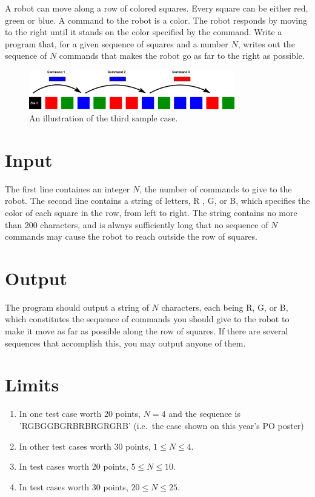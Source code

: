 
A robot can move along a row of colored squares. Every square can 
be either red, green or blue. A command to the robot is a color. The robot responds
by moving to the right until it stands on the color specified by the command. Write a program that,
for a given sequence of squares and a number $N$, writes out the sequence of $N$ commands that
makes the robot go as far to the right as possible.

\begin{figure}[ht!]
\centering
\includegraphics[width=0.8\textwidth]{fargrobot_eng.png}
\caption{An illustration of the third sample case.}
\label{overflow}
\end{figure}


\section*{Input}
The first line containes an integer $N$, the number of commands to give to the robot.
The second line contains a string of letters, R , G, or B, which specifies the color
of each square in the row, from left to right. The string contains no more than 
200 characters, and is always sufficiently long that no sequence of 
$N$ commands may cause the robot to reach outside the row of squares.

\section*{Output}

The program should output a string of $N$ characters, each being R, G,
or B, which constitutes the sequence of commands you should give to the robot to
make it move as far as possible along the row of squares. If there are several sequences that
accomplish this, you may output anyone of them.

\section*{Limits}

\begin{enumerate}
\item In one test case worth 20 points, $N=4$ and the sequence is 
  'RGBGGBGRBRBRGRGRB' (i.e.\ the case shown on this year's PO poster)
\item In other test cases worth 30 points, $1 \le N \le 4$.
\item In test cases worth 20 points, $5 \le N \le 10$. 
\item In test cases worth 30 points, $20 \le N \le 25$.
\end{enumerate}

